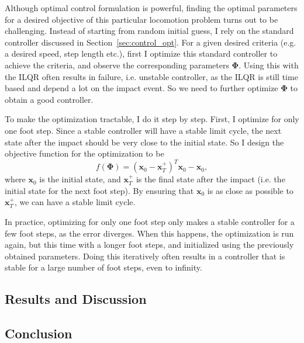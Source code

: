 Although optimal control formulation is powerful, finding the optimal parameters for a desired objective of this particular locomotion problem turns out to be challenging. Instead of starting from random initial guess, I rely on the standard controller discussed in Section~\ref{sec:control_opt}. For a given desired criteria (e.g. a desired speed, step length etc.), first I optimize this standard controller to achieve the criteria, and observe the corresponding parameters $\bm{\Phi}$. Using this with the ILQR often results in failure, i.e. unstable controller, as the ILQR is still time based and depend a lot on the impact event. So we need to further optimize $\bm{\Phi}$ to obtain a good controller.

To make the optimization tractable, I do it step by step. First, I optimize for only one foot step. Since a stable controller will have a stable limit cycle, the next state after the impact should be very close to the initial state. So I design the objective function for the optimization to be 
\begin{equation}
f(\bm{\Phi}) = (\bm{x}_0 - \bm{x}_T^+)^T \bm{x}_0 - \bm{x}_0,
\end{equation}
where $\bm{x}_0$ is the initial state, and $\bm{x}_T^+$ is the final state after the impact (i.e. the initial state for the next foot step). By ensuring that $\bm{x}_0$ is as close as possible to $\bm{x}_T^+$, we can have a stable limit cycle. 

In practice, optimizing for only one foot step only makes a stable controller for a few foot steps, as the error diverges. When this happens, the optimization is run again, but this time with a longer foot steps, and initialized using the previously obtained parameters. Doing this iteratively often results in a controller that is stable for a large number of foot steps, even to infinity. 

\subsection{Results and Discussion}
\label{sec:results}


\subsection{Conclusion}
\label{sec:conclusion}





